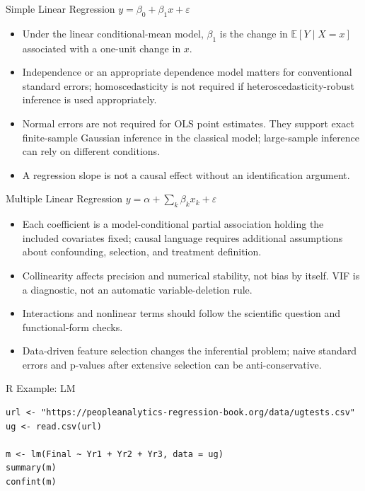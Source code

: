 \documentclass[aspectratio=169]{beamer}
\begin{document}
\begin{frame}{Simple Linear Regression}
$y = \beta_0 + \beta_1 x + \varepsilon$
\begin{itemize}
  \item Under the linear conditional-mean model, $\beta_1$ is the change in $\mathbb{E}[Y\mid X=x]$ associated with a one-unit change in $x$.
  \item Independence or an appropriate dependence model matters for conventional standard errors; homoscedasticity is not required if heteroscedasticity-robust inference is used appropriately.
  \item Normal errors are not required for OLS point estimates. They support exact finite-sample Gaussian inference in the classical model; large-sample inference can rely on different conditions.
  \item A regression slope is not a causal effect without an identification argument.
\end{itemize}
\end{frame}

\begin{frame}{Multiple Linear Regression}
$y = \alpha + \sum_k \beta_k x_k + \varepsilon$
\begin{itemize}
  \item Each coefficient is a model-conditional partial association holding the included covariates fixed; causal language requires additional assumptions about confounding, selection, and treatment definition.
  \item Collinearity affects precision and numerical stability, not bias by itself. VIF is a diagnostic, not an automatic variable-deletion rule.
  \item Interactions and nonlinear terms should follow the scientific question and functional-form checks.
  \item Data-driven feature selection changes the inferential problem; naive standard errors and p-values after extensive selection can be anti-conservative.
\end{itemize}
\end{frame}

\begin{frame}[fragile]{R Example: LM}
\begin{lstlisting}[style=rcode]
url <- "https://peopleanalytics-regression-book.org/data/ugtests.csv"
ug <- read.csv(url)

m <- lm(Final ~ Yr1 + Yr2 + Yr3, data = ug)
summary(m)
confint(m)
\end{lstlisting}
\end{frame}
\end{document}
